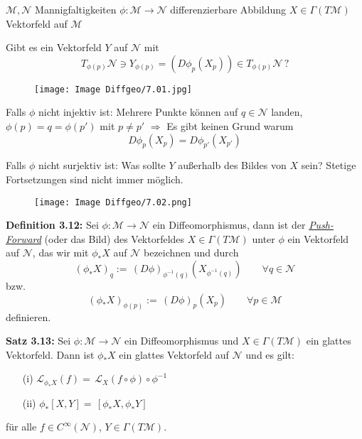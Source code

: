 \documentclass[fleqn, 12pt, letterpaper]{article}
\begin{document}
\(\mathcal{M}, \mathcal{N}\) Mannigfaltigkeiten  
\(\phi: \mathcal{M} \to \mathcal{N}\) differenzierbare Abbildung  
\(X \in \Gamma(T\mathcal{M})\) Vektorfeld auf \(\mathcal{M}\)

Gibt es ein Vektorfeld \(Y\) auf \(\mathcal{N}\) mit
\[
T_{\phi(p)} \mathcal{N} \ni Y_{\phi(p)} = \left( D\phi_p (X_p) \right) \in T_{\phi(p)} \mathcal{N} \, ?
\]
  \begin{figure}[H]
    \centering
    \texttt{[image: Image Diffgeo/7.01.jpg]}
 \end{figure}
Falls \(\phi\) nicht injektiv ist: Mehrere Punkte können auf \(q \in \mathcal{N}\) landen, \(\phi(p) = q = \phi(p')\) mit $p\neq p'$
\(\Rightarrow\) Es gibt keinen Grund warum
\[
D\phi_p(X_p) = D\phi_{p'}(X_{p'})
\]

Falls \(\phi\) nicht surjektiv ist: Was sollte \(Y\) außerhalb des Bildes von \(X\) sein?  
Stetige Fortsetzungen sind nicht immer möglich.

 \begin{figure}[H]
    \centering
    \texttt{[image: Image Diffgeo/7.02.png]}
 \end{figure}

\textbf{Definition 3.12:}  
Sei \(\phi: \mathcal{M} \to \mathcal{N}\) ein Diffeomorphismus, dann ist der \emph{\underline{Push-Forward}} (oder das Bild) des Vektorfeldes \(X \in \Gamma(T\mathcal{M})\) unter \(\phi\) ein Vektorfeld auf \(\mathcal{N}\), das wir mit \(\phi_* X\) auf \(\mathcal{N}\) bezeichnen und durch
\[
(\phi_* X)_q := \, (D\phi)_{\phi^{-1}(q)}(X_{\phi^{-1}(q)}) \qquad \forall q \in \mathcal{N}
\]
bzw.
\[
(\phi_* X)_{\phi(p)} := \, (D\phi)_p(X_p) \qquad \forall p \in \mathcal{M}
\]
definieren.

\vspace{0.5cm}

\textbf{Satz 3.13:}  
Sei \(\phi: \mathcal{M} \to \mathcal{N}\) ein Diffeomorphismus und \(X \in \Gamma(T\mathcal{M})\) ein glattes Vektorfeld.  
Dann ist \(\phi_* X\) ein glattes Vektorfeld auf \(\mathcal{N}\) und es gilt:
\begin{itemize}
  \item[(i)] \(\mathcal{L}_{\phi_* X}(f) = \, \mathcal{L}_X(f \circ \phi) \circ \phi^{-1}\)
  \item[(ii)] \(\phi_* [X, Y] = \, [\phi_{*}X,\phi_{*}Y]\)
\end{itemize}
für alle \(f \in C^\infty(\mathcal{N})\), \(Y \in \Gamma(T\mathcal{M})\).\\
\end{document}
